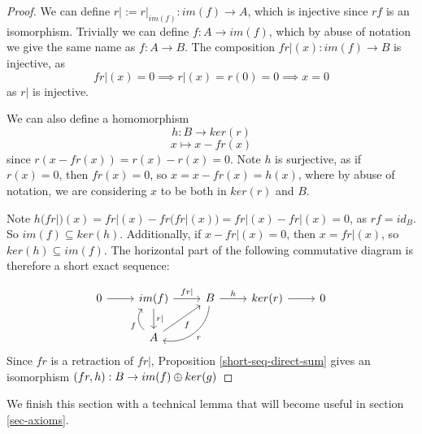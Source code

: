 \begin{proof}
We can define $r|:=r|_{im(f)}:im(f)\rightarrow A$, which is injective since $rf$ is an isomorphism. Trivially we can define $f:A\rightarrow im(f)$, which by abuse of notation we give the same name as $f:A\rightarrow B$. The composition $fr|(x):im(f)\rightarrow B$ is injective, as $$fr|(x)=0\implies r|(x)=r(0)=0\implies x=0$$
as $r|$ is injective.

We can also define a homomorphism $$h:B\rightarrow ker(r)$$
$$x\mapsto x-fr(x)$$
since $r(x-fr(x))=r(x)-r(x)=0$. Note $h$ is surjective, as if $r(x)=0$, then $fr(x)=0$, so $x=x-fr(x)=h(x)$, where by abuse of notation, we are considering $x$ to be both in $ker(r)$ and $B$.

Note $h(fr|)(x)=fr|(x)-fr(fr|(x))=fr|(x)-fr|(x)=0$, as $rf=id_B$. So $im(f)\subseteq ker(h)$. Additionally, if $x-fr|(x)=0$, then $x=fr|(x)$, so $ker(h)\subseteq im(f)$. The horizontal part of the following commutative diagram is therefore a short exact sequence:

\[\begin{tikzcd}
0 \arrow[r] & im(f) \arrow[d, "r|"] \arrow[r, "fr|"]          & B \arrow[ld, "r", bend left=49] \arrow[r, "h"] & ker(r) \arrow[r] & 0 \\
            & A \arrow[u, "f", bend left=49] \arrow[ru, "f"'] &                                                &                  &  
\end{tikzcd}\]
Since $fr$ is a retraction of $fr|$, Proposition \ref{short-seq-direct-sum} gives an isomorphism $(fr,h):B\rightarrow im(f)\oplus ker(g)$
\end{proof}

We finish this section with a technical lemma that will become useful in section \ref{sec-axioms}.

